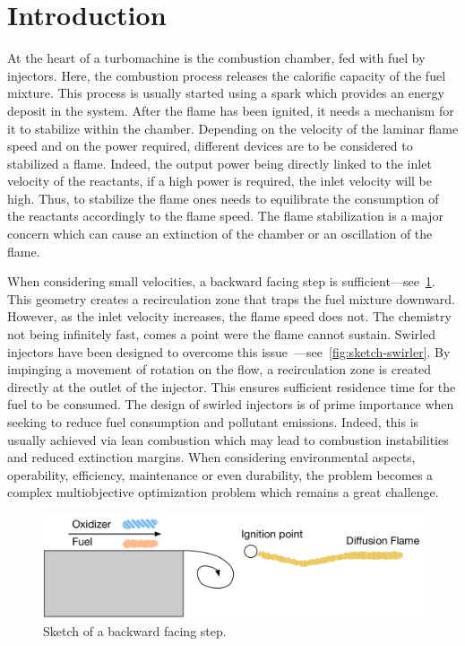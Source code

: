 \newcommand{\pdv}[2]{\frac{\partial{#1}}{\partial{#2}}}
\newcommand{\tilda}[1]{\tilde{#1}}

\section{Introduction}\label{sec:intro}

At the heart of a turbomachine is the combustion chamber, fed with fuel by injectors. Here, the combustion process releases the calorific capacity of the fuel mixture. This process is usually started using a spark which provides an energy deposit in the system. After the flame has been ignited, it needs a mechanism for it to stabilize within the chamber. Depending on the velocity of the laminar flame speed and on the power required, different devices are to be considered to stabilized a flame. Indeed, the output power being directly linked to the inlet velocity of the reactants, if a high power is required, the inlet velocity will be high. Thus, to stabilize the flame ones needs to equilibrate the consumption of the reactants accordingly to the flame speed. The flame stabilization is a major concern which can cause an extinction of the chamber or an oscillation of the flame.

 When considering small velocities, a backward facing step is sufficient---see~\cref{fig:sketch-step}. This geometry creates a recirculation zone that traps the fuel mixture downward. However, as the inlet velocity increases, the flame speed does not. The chemistry not being infinitely fast, comes a point were the flame cannot sustain. Swirled injectors have been designed to overcome this issue~\cite{Lilley1977}---see~\cref{fig:sketch-swirler}. By impinging a movement of rotation on the flow, a recirculation zone is created directly at the outlet of the injector. This ensures sufficient residence time for the fuel to be consumed. The design of swirled injectors is of prime importance when seeking to reduce fuel consumption and pollutant emissions. Indeed, this is usually achieved via lean combustion which may lead to combustion instabilities and reduced extinction margins. When considering environmental aspects, operability, efficiency, maintenance or even durability, the problem becomes a complex multiobjective optimization problem which remains a great challenge.

\begin{figure}[!h]
\centering
\includegraphics[width=\linewidth,keepaspectratio]{fig/applications/swirler/sketch_step.pdf}
\caption{Sketch of a backward facing step.}
\label{fig:sketch-step}
\end{figure}

